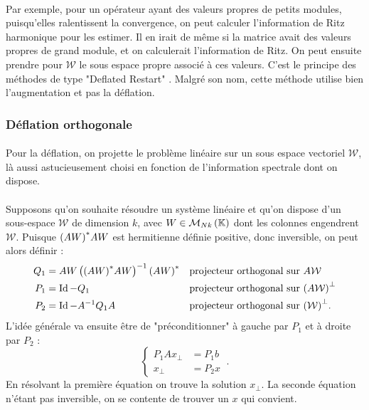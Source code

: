       \paragraph{}
      Par exemple, pour un opérateur ayant des valeurs propres de petits modules, puisqu'elles ralentissent la convergence, on peut calculer l'information de Ritz harmonique pour les estimer.
      Il en irait de même si la matrice avait des valeurs propres de grand module, et on calculerait l'information de Ritz.
      On peut ensuite prendre pour $\mathcal{W}$ le sous espace propre associé à ces valeurs.
      C'est le principe des méthodes de type "Deflated Restart" \cite{Vasseur2016, Morgan2002, Pinel2010}.
      Malgré son nom, cette méthode utilise bien l'augmentation et pas la déflation.


    \subsubsection{Déflation orthogonale}

      \paragraph{}
      Pour la déflation, on projette le problème linéaire sur un sous espace vectoriel $\mathcal{W}$, là aussi astucieusement choisi en fonction de l'information spectrale dont on dispose.

      \paragraph{}
      Supposons qu'on souhaite résoudre un système linéaire et qu'on dispose d'un sous-espace $\mathcal{W}$ de dimension $k$, avec $W\in\mathcal{M}_{N k}\left(\mathbb{K}\right)$ dont les colonnes engendrent $\mathcal{W}$.
      Puisque ${\left(AW\right)}^*AW$ est hermitienne définie positive, donc inversible, on peut alors définir \cite{CoulaudGiraudRametEtAl2013} :
      \begin{align*}
        Q_1 &= AW\left({\left(AW\right)}^*AW\right)^{-1}{\left(AW\right)}^* &&\textrm{projecteur orthogonal sur $A\mathcal{W}$} \\
        P_1 &= \operatorname{Id} - Q_1 &&\textrm{projecteur orthogonal sur $\left(A\mathcal{W}\right)^\perp$} \\
        P_2 &= \operatorname{Id} - A^{-1}Q_1A &&\textrm{projecteur orthogonal sur $\left(\mathcal{W}\right)^\perp$.}
      \end{align*}
      L'idée générale va ensuite être de "préconditionner" à gauche par $P_1$ et à droite par $P_2$ :
      \begin{equation*}
        \left\{
        \begin{aligned}
          P_1Ax_\perp &= P_1b\\
          x_\perp &= P_2x
        \end{aligned}
        \right.\ .
      \end{equation*}
      En résolvant la première équation on trouve la solution $x_\perp$. La seconde équation n'étant pas inversible, on se contente de trouver un $x$ qui convient.

